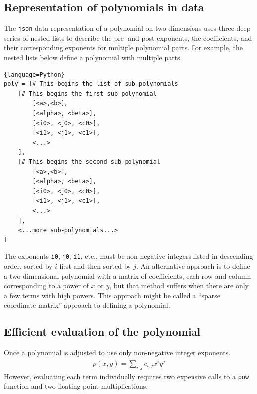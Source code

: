 \subsection{Representation of polynomials in data}

The \texttt{json} data representation of a polynomial on two dimensions uses three-deep series of nested lists to describe the pre- and post-exponents, the coefficients, and their corresponding exponents for multiple polynomial parts.  For example, the nested lists below define a polynomial with multiple parts.

\begin{lstlisting}{language=Python}
poly = [# This begins the list of sub-polynomials
    [# This begins the first sub-polynomial
        [<a>,<b>], 
        [<alpha>, <beta>],
        [<i0>, <j0>, <c0>],
        [<i1>, <j1>, <c1>],
        <...>
    ],
    [# This begins the second sub-polynomial
        [<a>,<b>], 
        [<alpha>, <beta>],
        [<i0>, <j0>, <c0>],
        [<i1>, <j1>, <c1>],
        <...>
    ],
    <...more sub-polynomials...>
]
\end{lstlisting}

The exponents \texttt{i0}, \texttt{j0}, \texttt{i1}, etc., must be non-negative integers listed in descending order, sorted by $i$ first and then sorted by $j$.  An alternative approach is to define a two-dimensional polynomial with a matrix of coefficients, each row and column corresponding to a power of $x$ or $y$, but that method suffers when there are only a few terms with high powers.  This approach might be called a ``sparse coordinate matrix'' approach to defining a polynomial.

\subsection{Efficient evaluation of the polynomial}

Once a polynomial is adjusted to use only non-negative integer exponents.
\begin{align}
p(x,y) = \sum_{i,j} c_{i,j} x^i y^j
\end{align}
However, evaluating each term individually requires two expensive calls to a \verb|pow| function and two floating point multiplications.

